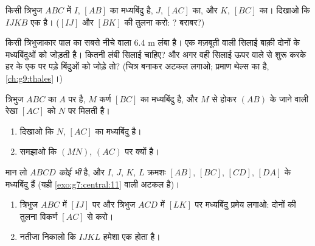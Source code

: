\begin{exercise}[$\star\star$]\label{exo:g8:midpoints:6}
किसी त्रिभुज $ABC$ में $I$, $[AB]$ का मध्यबिंदु है, $J$, $[AC]$ का,
और $K$, $[BC]$ का। दिखाओ कि $IJKB$ एक  है। ($[IJ]$
और $[BK]$ की तुलना करो: ? बराबर?)
\end{exercise}

\begin{exercise}[$\star\star$]\label{exo:g8:midpoints:7}
किसी त्रिभुजाकार पाल का सबसे नीचे वाला  $6.4$ m लंबा है। एक
मज़बूती वाली सिलाई बाक़ी दोनों  के मध्यबिंदुओं को जोड़ती है।
कितनी लंबी सिलाई चाहिए? और अगर वही सिलाई ऊपर वाले  से शुरू
करके हर  के एक  पर पड़े बिंदुओं को जोड़े तो? (चित्र बनाकर
अटकल लगाओ; प्रमाण थेल्स का है, \cref{ch:g9:thales}।)
\end{exercise}

\begin{exercise}[$\star\star$]\label{exo:g8:midpoints:8}
त्रिभुज $ABC$ का $A$ पर  है, $M$ कर्ण $[BC]$ का मध्यबिंदु है,
और $M$ से होकर $(AB)$ के  जाने वाली रेखा $[AC]$ को $N$ पर
मिलती है।
\begin{enumerate}
  \item दिखाओ कि $N$, $[AC]$ का मध्यबिंदु है।
  \item समझाओ कि $(MN)$, $(AC)$ पर  क्यों है।
\end{enumerate}
\end{exercise}

\begin{exercise}[$\star\star\star$]\label{exo:g8:midpoints:9}
मान लो $ABCD$ \emph{कोई भी}  है, और $I$, $J$, $K$, $L$
क्रमशः $[AB]$, $[BC]$, $[CD]$, $[DA]$ के मध्यबिंदु हैं (यही
\cref{exo:g7:central:11} वाली अटकल है)।
\begin{enumerate}
  \item त्रिभुज $ABC$ में  $[IJ]$ पर और त्रिभुज $ACD$ में
         $[LK]$ पर मध्यबिंदु प्रमेय लगाओ: दोनों की तुलना
        विकर्ण $[AC]$ से करो।
  \item नतीजा निकालो कि $IJKL$ हमेशा एक  होता है।
\end{enumerate}
\end{exercise}

